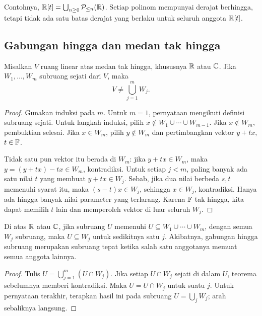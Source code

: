 Contohnya,
$\mathbb{R}[t]=\bigcup_{n\ge0}\mathcal P_{\le n}(\mathbb{R})$.
Setiap polinom mempunyai derajat berhingga, tetapi tidak ada satu
batas derajat yang berlaku untuk seluruh anggota $\mathbb{R}[t]$.

\subsection{Gabungan hingga dan medan tak hingga}

\begin{teorema}
    Misalkan $V$ ruang linear atas medan tak hingga, khususnya
    $\mathbb{R}$ atau $\mathbb{C}$. Jika $W_1,\ldots,W_m$ subruang sejati dari $V$,
    maka
    \[
        V\ne\bigcup_{j=1}^m W_j.
    \]
\end{teorema}
\begin{proof}
    Gunakan induksi pada $m$. Untuk $m=1$, pernyataan mengikuti
    definisi subruang sejati.
    Untuk langkah induksi, pilih
    $x\notin W_1\cup\cdots\cup W_{m-1}$.
    Jika $x\notin W_m$, pembuktian selesai.
    Jika $x\in W_m$, pilih $y\notin W_m$ dan pertimbangkan
    vektor $y+tx$, $t\in\mathbb{F}$.

    Tidak satu pun vektor itu berada di $W_m$: jika $y+tx\in W_m$,
    maka $y=(y+tx)-tx\in W_m$, kontradiksi.
    Untuk setiap $j<m$, paling banyak ada satu nilai $t$ yang
    membuat $y+tx\in W_j$. Sebab, jika dua nilai berbeda $s,t$
    memenuhi syarat itu, maka $(s-t)x\in W_j$, sehingga
    $x\in W_j$, kontradiksi.
    Hanya ada hingga banyak nilai parameter yang terlarang.
    Karena $\mathbb{F}$ tak hingga, kita dapat memilih $t$ lain dan
    memperoleh vektor di luar seluruh $W_j$.
\end{proof}

\begin{prop}
    \label{linear:termuat-gabungan}
    Di atas $\mathbb{R}$ atau $\mathbb{C}$, jika subruang $U$ memenuhi
    $U\subseteq W_1\cup\cdots\cup W_m$, dengan semua $W_j$
    subruang, maka $U\subseteq W_j$ untuk sedikitnya satu $j$.
    Akibatnya, gabungan hingga subruang merupakan subruang tepat
    ketika salah satu anggotanya memuat semua anggota lainnya.
\end{prop}
\begin{proof}
    Tulis $U=\bigcup_{j=1}^m(U\cap W_j)$.
    Jika setiap $U\cap W_j$ sejati di dalam $U$, teorema sebelumnya
    memberi kontradiksi. Maka $U=U\cap W_j$ untuk suatu $j$.
    Untuk pernyataan terakhir, terapkan hasil ini pada subruang
    $U=\bigcup_j W_j$; arah sebaliknya langsung.
\end{proof}

